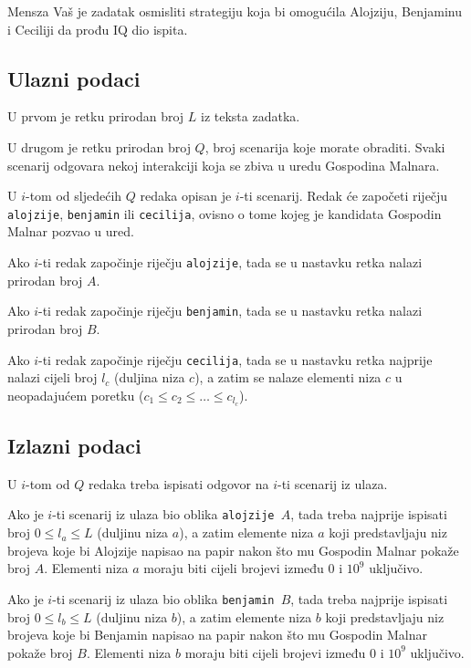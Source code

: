 \begin{statement}[
  problempoints=100,
  timelimit=1 sekunda,
  memorylimit=512 MiB,
]{Mensza}
Vaš je zadatak osmisliti strategiju koja bi omogućila Alojziju, Benjaminu i
Ceciliji da prođu IQ dio ispita.

\subsection*{Ulazni podaci}
U prvom je retku prirodan broj $L$ iz teksta zadatka.

U drugom je retku prirodan broj $Q$, broj scenarija koje morate obraditi. Svaki
scenarij odgovara nekoj interakciji koja se zbiva u uredu Gospodina Malnara.

U $i$-tom od sljedećih $Q$ redaka opisan je $i$-ti scenarij. Redak će započeti
riječju \texttt{alojzije}, \texttt{benjamin} ili \texttt{cecilija}, ovisno o
tome kojeg je kandidata Gospodin Malnar pozvao u ured.

Ako $i$-ti redak započinje riječju \texttt{alojzije}, tada se u nastavku retka
nalazi prirodan broj $A$.

Ako $i$-ti redak započinje riječju \texttt{benjamin}, tada se u nastavku retka
nalazi prirodan broj $B$.

Ako $i$-ti redak započinje riječju \texttt{cecilija}, tada se u nastavku retka
najprije nalazi cijeli broj $l_c$ (duljina niza $c$), a zatim se nalaze
elementi niza $c$ u neopadajućem poretku ($c_1 \le c_2 \le \ldots \le c_{l_c}$).

\subsection*{Izlazni podaci}
U $i$-tom od $Q$ redaka treba ispisati odgovor na $i$-ti scenarij iz ulaza.

Ako je $i$-ti scenarij iz ulaza bio oblika \texttt{alojzije $A$}, tada treba
najprije ispisati broj $0 \le l_a \le L$ (duljinu niza $a$), a zatim elemente niza
$a$ koji predstavljaju niz brojeva koje bi Alojzije napisao na papir nakon što
mu Gospodin Malnar pokaže broj $A$. Elementi niza $a$ moraju biti cijeli brojevi
između $0$ i $10^9$ uključivo.

Ako je $i$-ti scenarij iz ulaza bio oblika \texttt{benjamin $B$}, tada treba
najprije ispisati broj $0 \le l_b \le L$ (duljinu niza $b$), a zatim elemente niza $b$ koji
predstavljaju niz brojeva koje bi Benjamin napisao na papir nakon što mu Gospodin
Malnar pokaže broj $B$. Elementi niza $b$ moraju biti cijeli brojevi između $0$
i $10^9$ uključivo.


\end{statement}
